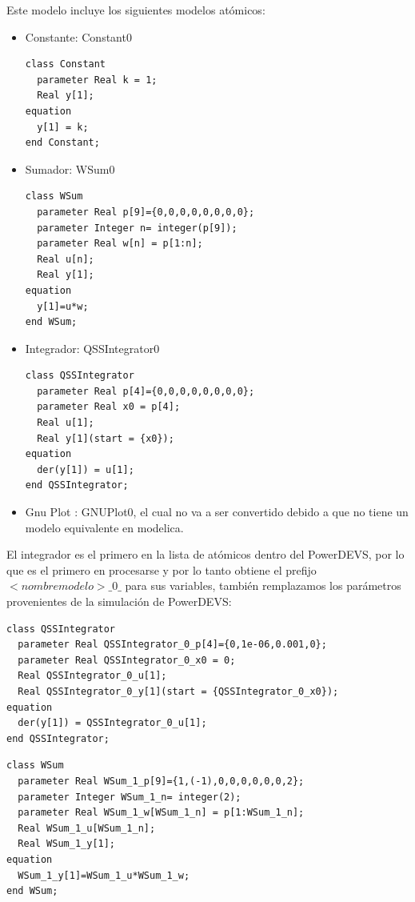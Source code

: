 \documentclass[a4paper,	11pt]{report}
\begin{document}
Este modelo incluye los siguientes modelos atómicos:
\begin{itemize}
	\item Constante: Constant0
\begin{verbatim}	
class Constant
  parameter Real k = 1;
  Real y[1];
equation
  y[1] = k;
end Constant;
\end{verbatim}

	\item Sumador: WSum0
\begin{verbatim}	
class WSum
  parameter Real p[9]={0,0,0,0,0,0,0,0};
  parameter Integer n= integer(p[9]);
  parameter Real w[n] = p[1:n];
  Real u[n];
  Real y[1];
equation
  y[1]=u*w;
end WSum;
\end{verbatim}

	\item Integrador: QSSIntegrator0
\begin{verbatim}	
class QSSIntegrator
  parameter Real p[4]={0,0,0,0,0,0,0,0};
  parameter Real x0 = p[4];
  Real u[1];
  Real y[1](start = {x0});
equation
  der(y[1]) = u[1];
end QSSIntegrator;
\end{verbatim}

	\item Gnu Plot : GNUPlot0, el cual no va a ser convertido debido a que no tiene un modelo equivalente en modelica.
\end{itemize}

El integrador es el primero en la lista de atómicos dentro del PowerDEVS, por lo que es el primero en procesarse y por lo tanto obtiene el prefijo $<nombre modelo>\_0\_$ para sus variables, también remplazamos los parámetros provenientes de la simulación de PowerDEVS:

\begin{verbatim}	
class QSSIntegrator
  parameter Real QSSIntegrator_0_p[4]={0,1e-06,0.001,0};
  parameter Real QSSIntegrator_0_x0 = 0;
  Real QSSIntegrator_0_u[1];
  Real QSSIntegrator_0_y[1](start = {QSSIntegrator_0_x0});
equation
  der(y[1]) = QSSIntegrator_0_u[1];
end QSSIntegrator;
\end{verbatim}

\begin{verbatim}
class WSum
  parameter Real WSum_1_p[9]={1,(-1),0,0,0,0,0,0,2};
  parameter Integer WSum_1_n= integer(2);
  parameter Real WSum_1_w[WSum_1_n] = p[1:WSum_1_n];
  Real WSum_1_u[WSum_1_n];
  Real WSum_1_y[1];
equation
  WSum_1_y[1]=WSum_1_u*WSum_1_w;
end WSum;
\end{verbatim}
\end{document}
